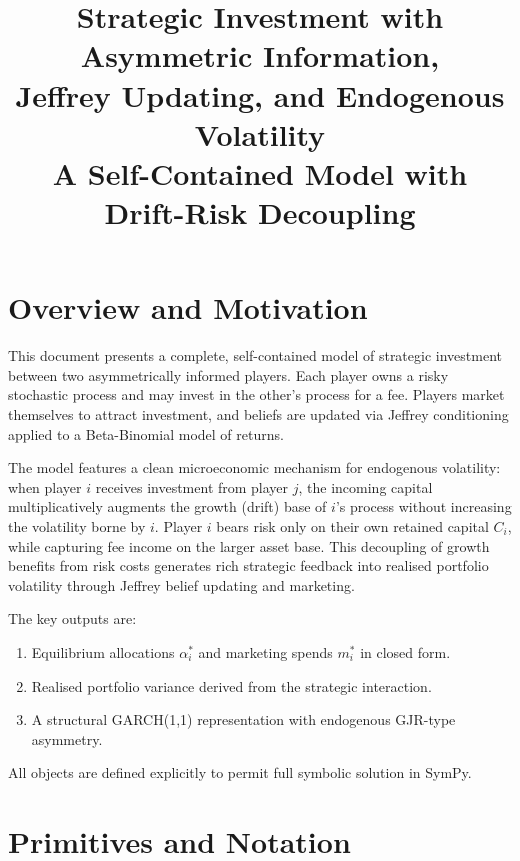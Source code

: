 \documentclass[12pt,a4paper]{article}
\newcommand{\1}{\mathbf{1}}
\begin{document}
\title{\textbf{Strategic Investment with Asymmetric Information,\\
Jeffrey Updating, and Endogenous Volatility}\\[0.5em]
\large A Self-Contained Model with Drift-Risk Decoupling}

\author{}
\date{}
\maketitle
\tableofcontents
\newpage

\section{Overview and Motivation}

This document presents a complete, self-contained model of strategic investment between two asymmetrically informed players. Each player owns a risky stochastic process and may invest in the other's process for a fee. Players market themselves to attract investment, and beliefs are updated via Jeffrey conditioning applied to a Beta-Binomial model of returns.

The model features a clean microeconomic mechanism for endogenous volatility: when player \(i\) receives investment from player \(j\), the incoming capital multiplicatively augments the growth (drift) base of \(i\)'s process without increasing the volatility borne by \(i\). Player \(i\) bears risk only on their own retained capital \(C_i\), while capturing fee income on the larger asset base. This decoupling of growth benefits from risk costs generates rich strategic feedback into realised portfolio volatility through Jeffrey belief updating and marketing.

The key outputs are:
\begin{enumerate}[label=(\roman*)]
  \item Equilibrium allocations \(\alpha_i^*\) and marketing spends \(m_i^*\) in closed form.
  \item Realised portfolio variance derived from the strategic interaction.
  \item A structural GARCH(1,1) representation with endogenous GJR-type asymmetry.
\end{enumerate}

All objects are defined explicitly to permit full symbolic solution in SymPy.

\section{Primitives and Notation}
\end{document}

